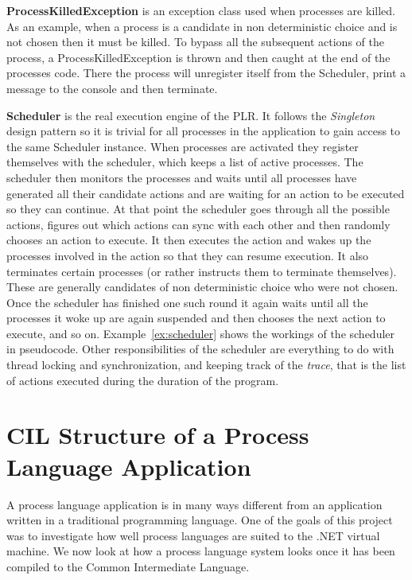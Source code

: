 	\textbf{ProcessKilledException} is an exception class used when processes
	are killed. As an example, when a process is a candidate in non deterministic
	choice and is not chosen then it must be killed. To bypass all the subsequent
	actions of the process, a \textsf{ProcessKilledException} is thrown and then
	caught at the end of the processes code. There the process will unregister
	itself from the \textsf{Scheduler}, print a message to the console and then
	terminate.
	
	\textbf{Scheduler} is the real execution engine of the PLR. It follows the
	\textit{Singleton}  design pattern so it is trivial for all
	processes in the application to gain access to the same \textsf{Scheduler}
	instance. When processes are activated they register themselves with the 
	scheduler, which keeps a list of active processes. The scheduler then 
	monitors the processes and waits until all processes have generated all 
	their candidate actions and are waiting for an action to be executed so they 
	can continue. At that point the scheduler goes through all the possible 
	actions, figures out which actions can sync with each other and then 
	randomly chooses an action to execute. It then executes the action and wakes 
	up the processes involved in the action so that they can resume execution. 
	It also terminates certain processes (or rather instructs them to terminate 
	themselves). These are generally candidates of non deterministic choice who 
	were not chosen. Once the scheduler has finished one such round it again 
	waits until all the processes it woke up are again suspended and then 
	chooses the next action to execute, and so on. Example~\ref{ex:scheduler} 
	shows the workings of the scheduler in pseudocode. Other responsibilities of 
	the scheduler are everything to do with thread locking and synchronization, 
	and keeping track of the \textit{trace}, that is the list of actions 
	executed during the duration of the program.
	 

\section{CIL Structure of a Process Language Application}\label{cil_structure}

	A process language application is in many ways different from an application
	written in a traditional programming language. One of the goals of this  
	project was to investigate how well process languages are suited to the .NET
	virtual machine. We now look at how a process language system looks once it 
	has been compiled to the Common Intermediate Language.
	
